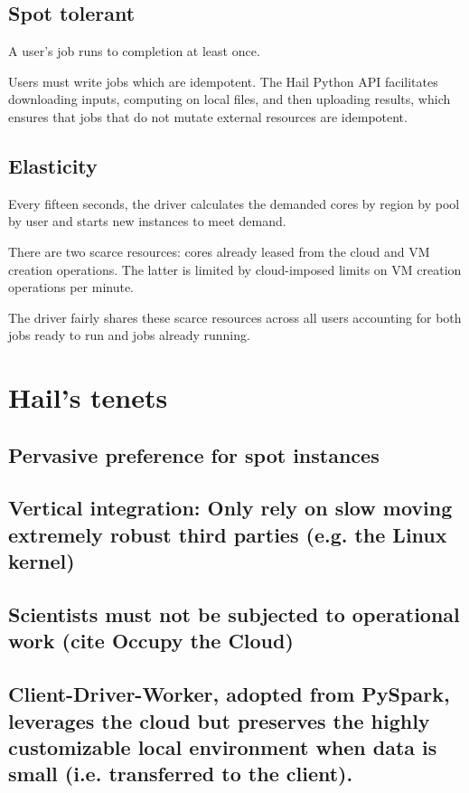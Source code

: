 \documentclass[sigconf, nonacm]{acmart}
\begin{document}
\subsection{Spot tolerant}
A user’s job runs to completion at least once.

Users must write jobs which are idempotent. The Hail Python API facilitates downloading inputs, computing on local files, and then uploading results, which ensures that jobs that do not mutate external resources are idempotent.

\subsection{Elasticity}

Every fifteen seconds, the driver calculates the demanded cores by region by pool by user and starts new instances to meet demand.

There are two scarce resources: cores already leased from the cloud and VM creation operations. The latter is limited by cloud-imposed limits on VM creation operations per minute.

The driver fairly shares these scarce resources across all users accounting for both jobs ready to run and jobs already running.

\section{Hail’s tenets}

\subsection{Pervasive preference for spot instances}

\subsection{Vertical integration: Only rely on slow moving extremely robust third parties (e.g. the Linux kernel)}

\subsection{Scientists must not be subjected to operational work (cite Occupy the Cloud)}

\subsection{Client-Driver-Worker, adopted from PySpark, leverages the cloud but preserves the highly customizable local environment when data is small (i.e. transferred to the client).}
\end{document}
